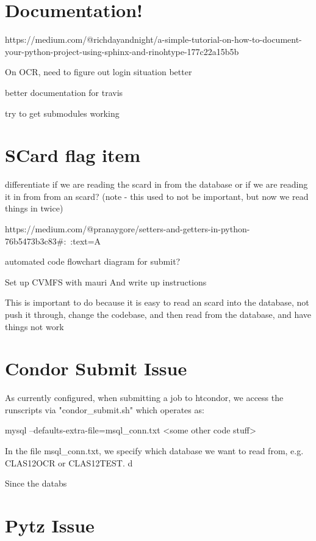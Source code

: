 \section{Documentation!}
https://medium.com/@richdayandnight/a-simple-tutorial-on-how-to-document-your-python-project-using-sphinx-and-rinohtype-177c22a15b5b


On OCR, need to figure out login situation better

better documentation for travis

try to get submodules working



\section{SCard flag item}

differentiate if we are reading the scard in from the database or if we are reading it in from from an scard? (note - this used to not be important, but now we read things in twice)

https://medium.com/@pranaygore/setters-and-getters-in-python-76b5473b3c83#:~:text=A%


automated code flowchart diagram for submit?

Set up CVMFS with mauri
 And write up instructions


This is important to do because it is easy to read an scard into the database, not push it through, change the codebase, and then read from the database, and have things not work


\section{Condor Submit Issue}

As currently configured, when submitting a job to htcondor, we access the runscripts via "condor_submit.sh" which operates as:

mysql --defaults-extra-file=msql_conn.txt <some other code stuff>

In the file msql_conn.txt, we specify which database we want to read from, e.g. CLAS12OCR or CLAS12TEST. d

Since the databs



\section{Pytz Issue}

